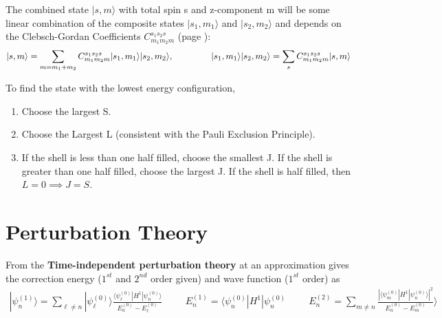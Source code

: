 The combined state $| s, m \rangle$  with total spin s and z-component m will be some linear combination of the composite states $| s_1, m_1 \rangle$ and $| s_2, m_2 \rangle$ and depends on the Clebsch-Gordan Coefficients $C_{m_1m_2m}^{s_1s_2s}$ (page \pageref{Clebsch-Gordan}):
\begin{align}
| s, m \rangle = \sum_{m=m_1+m_2} C_{m_1m_2m}^{s_1s_2s}| s_1, m_1 \rangle| s_2, m_2 \rangle, \hspace{1.5cm} | s_1, m_1 \rangle| s_2, m_2 \rangle = \sum_{s} C_{m_1m_2m}^{s_1s_2s}| s, m \rangle
\end{align}

\begin{fancybox}{}
To find the state with the lowest energy configuration,
	\begin{enumerate}
		\item Choose the largest S.
		\item Choose the Largest L (consistent with the Pauli Exclusion Principle).
		\item If the shell is less than one half filled, choose the smallest J. If the shell is greater than one half filled, choose the largest J. If the shell is half filled, then $L=0 \implies J=S$.
	\end{enumerate}
\end{fancybox}

\section{Perturbation Theory}
From the \textbf{Time-independent perturbation theory} at an approximation gives the correction energy ($1^{st}$ and $2^{nd}$ order given) and wave function ($1^{st}$ order) as
\begin{align}
	| \psi_n^{(1)} \rangle = \sum_{\ell \neq n} | \psi_\ell^{(0)} \rangle \frac{\langle \psi_\ell^{(0)}|H^1| \psi_n^{(0)} \rangle }{E_n^{(0)}-E_\ell^{(0)}} \hspace{1cm} E_n^{(1)}=\langle \psi_n^{(0)}|H^1| \psi_n^{(0)} \hspace{1cm} E_n^{(2)} = \sum_{m \neq n} \frac{|\langle \psi_m^{(0)}|H^1| \psi_n^{(0)} \rangle|^2 }{E_n^{(0)}-E_m^{(0)}} \rangle  
\end{align}